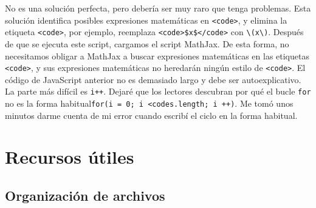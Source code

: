 \documentclass[12pt,]{krantz}
\makeatletter
\newenvironment{Shaded}{\begin{snugshade}}{\end{snugshade}}
\newcommand{\AttributeTok}[1]{\textcolor[rgb]{0.77,0.63,0.00}{#1}}
\newcommand{\CommentTok}[1]{\textcolor[rgb]{0.56,0.35,0.01}{\textit{#1}}}
\newcommand{\ControlFlowTok}[1]{\textcolor[rgb]{0.13,0.29,0.53}{\textbf{#1}}}
\newcommand{\NormalTok}[1]{#1}
\newcommand{\OperatorTok}[1]{\textcolor[rgb]{0.81,0.36,0.00}{\textbf{#1}}}
\newcommand{\SpecialCharTok}[1]{\textcolor[rgb]{0.00,0.00,0.00}{#1}}
\newcommand{\SpecialStringTok}[1]{\textcolor[rgb]{0.31,0.60,0.02}{#1}}
\newcommand{\VariableTok}[1]{\textcolor[rgb]{0.00,0.00,0.00}{#1}}
\newenvironment{kframe}{%
\medskip{}
\setlength{\fboxsep}{.8em}
 \def\at@end@of@kframe{}%
 \ifinner\ifhmode%
  \def\at@end@of@kframe{\end{minipage}}%
  \begin{minipage}{\columnwidth}%
 \fi\fi%
 \def\FrameCommand##1{\hskip\@totalleftmargin \hskip-\fboxsep
 \colorbox{shadecolor}{##1}\hskip-\fboxsep
     \hskip-\linewidth \hskip-\@totalleftmargin \hskip\columnwidth}%
 \MakeFramed {\advance\hsize-\width
   \@totalleftmargin\z@ \linewidth\hsize
   \@setminipage}}%
 {\par\unskip\endMakeFramed%
 \at@end@of@kframe}
\renewenvironment{Shaded}{\begin{kframe}}{\end{kframe}}
\theoremstyle{definition}
\theoremstyle{definition}
\theoremstyle{definition}
\theoremstyle{remark}
\makeatother
\begin{document}
\begin{Shaded}
\end{Shaded}

No es una solución perfecta, pero debería ser muy raro que tenga
problemas. Esta solución identifica posibles expresiones matemáticas en
\texttt{\textless{}code\textgreater{}}, y elimina la etiqueta
\texttt{\textless{}code\textgreater{}}, por ejemplo, reemplaza
\texttt{\textless{}code\textgreater{}\$x\$\textless{}/code\textgreater{}}
con \texttt{\textbackslash{}(x\textbackslash{})}. Después de que se
ejecuta este script, cargamos el script MathJax. De esta forma, no
necesitamos obligar a MathJax a buscar expresiones matemáticas en las
etiquetas \texttt{\textless{}code\textgreater{}}, y sus expresiones
matemáticas no heredarán ningún estilo de
\texttt{\textless{}code\textgreater{}}. El código de JavaScript anterior
no es demasiado largo y debe ser autoexplicativo. La parte más difícil
es \texttt{i++}. Dejaré que los lectores descubran por qué el bucle
\texttt{for} no es la forma
habitual\texttt{for(i\ =\ 0;\ i\ \textless{}codes.length;\ i\ ++)}. Me
tomó unos minutos darme cuenta de mi error cuando escribí el ciclo en la
forma habitual.

\hypertarget{recursos-utiles}{%
\section{Recursos útiles}\label{recursos-utiles}}

\hypertarget{organizacion-de-archivos}{%
\subsection{Organización de archivos}\label{organizacion-de-archivos}}
\end{document}
